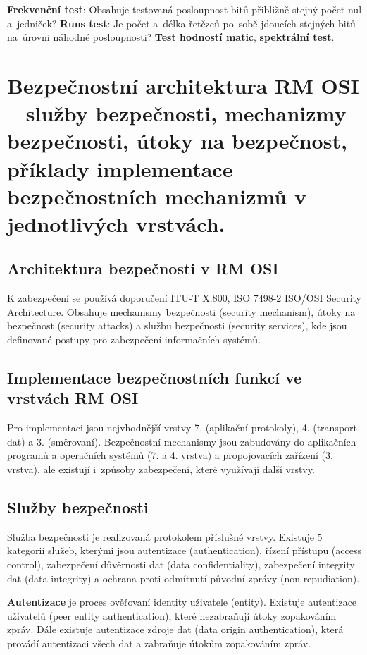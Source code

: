 \textbf{Frekvenční test}: Obsahuje testovaná posloupnost bitů přibližně stejný počet nul a~jedniček? \textbf{Runs test}: Je počet a~délka řetězců po~sobě jdoucích stejných bitů na~úrovni náhodné posloupnosti? \textbf{Test hodností matic}, \textbf{spektrální test}.


\clearpage
\section{Bezpečnostní architektura RM OSI -- služby bezpečnosti, mechanizmy bezpečnosti, útoky na bezpečnost, příklady implementace bezpečnostních mechanizmů v jednotlivých vrstvách.}

\subsection{Architektura bezpečnosti v RM OSI}

K zabezpečení se používá doporučení ITU-T X.800, ISO 7498-2 ISO/OSI Security Architecture. Obsahuje mechanismy bezpečnosti (security mechanism), útoky na bezpečnost (security attacks) a službu bezpečnosti (security services), kde jsou definované postupy pro zabezpečení informačních systémů.

\subsection{Implementace bezpečnostních funkcí ve vrstvách RM OSI}

Pro implementaci jsou nejvhodnější vrstvy 7. (aplikační protokoly), 4. (transport dat) a 3. (směrovaní). Bezpečnostní mechanismy jsou zabudovány do aplikačních programů a operačních systémů (7. a 4. vrstva)  a propojovacích zařízení (3. vrstva), ale existují i~způsoby zabezpečení, které využívají další vrstvy.

\subsection{Služby bezpečnosti}

Služba bezpečnosti je realizovaná protokolem příslušné vrstvy. Existuje 5 kategorií služeb, kterými jsou autentizace (authentication), řízení přístupu (access control), zabezpečení důvěrnosti dat (data confidentiality), zabezpečení integrity dat (data integrity) a ochrana proti odmítnutí původní zprávy (non-repudiation).

\textbf{Autentizace} je proces ověřovaní identity uživatele (entity). Existuje autentizace uživatelů (peer entity authentication), které nezabraňují útoky zopakováním zpráv. Dále existuje autentizace zdroje dat (data origin authentication), která provádí autentizaci všech dat a zabraňuje útokům zopakováním zpráv.

